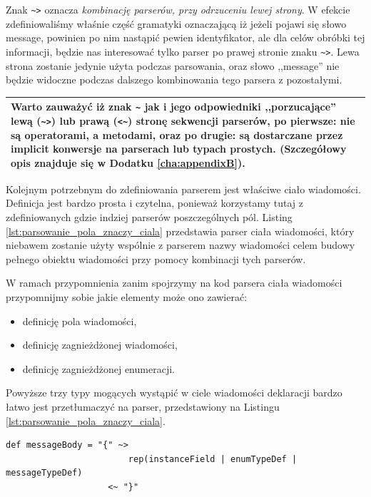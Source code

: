 \documentclass[pdflatex,11pt]{aghdpl}
\begin{document}
Znak \verb|~>| oznacza \textit{kombinację parserów, przy odrzuceniu lewej strony}. W efekcie zdefiniowaliśmy właśnie część gramatyki
oznaczającą iż jeżeli pojawi się słowo message, powinien po nim nastąpić pewien identyfikator, ale dla celów obróbki tej informacji, będzie nas interesować tylko
parser po prawej stronie znaku \verb|~>|. Lewa strona zostanie jedynie użyta podczas parsowania, oraz słowo ,,message'' nie będzie widoczne podczas dalszego
kombinowania tego parsera z pozostałymi.

\begin{center}
\begin{tabular}{|p{\textwidth}|}
\hline Warto zauważyć iż znak \verb|~| jak i jego odpowiedniki ,,porzucające'' lewą (\verb|~>|) lub prawą (\verb|<~|) stronę sekwencji 
parserów, po pierwsze: nie są operatorami, a metodami, oraz po drugie: są dostarczane przez implicit konwersje na parserach lub typach prostych. 
 (Szczegółowy opis znajduje się w Dodatku \ref{cha:appendixB}).\\
\hline
\end{tabular}
\end{center}

Kolejnym potrzebnym do zdefiniowania parserem jest właściwe ciało wiadomości. Definicja jest bardzo prosta i czytelna, ponieważ korzystamy tutaj z 
zdefiniowanych gdzie indziej parserów poszczególnych pól. Listing \ref{lst:parsowanie_pola_znaczy_ciala} przedstawia parser ciała wiadomości,
który niebawem zostanie użyty wspólnie z parserem nazwy wiadomości celem budowy pełnego obiektu wiadomości przy pomocy kombinacji tych parserów.

W ramach przypomnienia zanim spojrzymy na kod parsera ciała wiadomości przypomnijmy sobie jakie elementy może ono zawierać:
\begin{itemize}
 \item definicję pola wiadomości,
 \item definicję zagnieżdżonej wiadomości,
 \item definicję zagnieżdżonej enumeracji.
\end{itemize}

Powyższe trzy typy mogących wystąpić w ciele wiadomości deklaracji bardzo łatwo jest przetłumaczyć na parser,
przedstawiony na Listingu \ref{lst:parsowanie_pola_znaczy_ciala}.


\begin{lstlisting}[caption={Parser ciała wiadomości}, label={lst:parsowanie_pola_znaczy_ciala}]
def messageBody = "{" ~> 
                        rep(instanceField | enumTypeDef | messageTypeDef) 
                    <~ "}"
\end{lstlisting}
\end{document}
